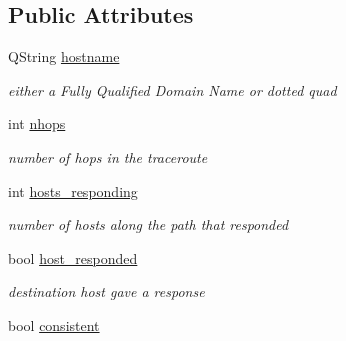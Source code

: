 \subsection*{Public Attributes}
\begin{CompactItemize}
\item 
\hypertarget{classTrStatus_4b9da6f5da534b2099d874f727aa8588}{
QString \hyperlink{classTrStatus_4b9da6f5da534b2099d874f727aa8588}{hostname}}
\label{classTrStatus_4b9da6f5da534b2099d874f727aa8588}

\begin{CompactList}\small\item\em either a Fully Qualified Domain Name or dotted quad \item\end{CompactList}\item 
\hypertarget{classTrStatus_06d17ca80c2fbccdc277ef622ed8bba6}{
int \hyperlink{classTrStatus_06d17ca80c2fbccdc277ef622ed8bba6}{nhops}}
\label{classTrStatus_06d17ca80c2fbccdc277ef622ed8bba6}

\begin{CompactList}\small\item\em number of hops in the traceroute \item\end{CompactList}\item 
\hypertarget{classTrStatus_0c123c43201bf027083df0c805767698}{
int \hyperlink{classTrStatus_0c123c43201bf027083df0c805767698}{hosts\_\-responding}}
\label{classTrStatus_0c123c43201bf027083df0c805767698}

\begin{CompactList}\small\item\em number of hosts along the path that responded \item\end{CompactList}\item 
\hypertarget{classTrStatus_368061a7714de48ba7d1d19f40ba1a88}{
bool \hyperlink{classTrStatus_368061a7714de48ba7d1d19f40ba1a88}{host\_\-responded}}
\label{classTrStatus_368061a7714de48ba7d1d19f40ba1a88}

\begin{CompactList}\small\item\em destination host gave a response \item\end{CompactList}\item 
\hypertarget{classTrStatus_83bd8e13b56c3faac9649abe37df3d8d}{
bool \hyperlink{classTrStatus_83bd8e13b56c3faac9649abe37df3d8d}{consistent}}
\label{classTrStatus_83bd8e13b56c3faac9649abe37df3d8d}


\end{CompactItemize}
